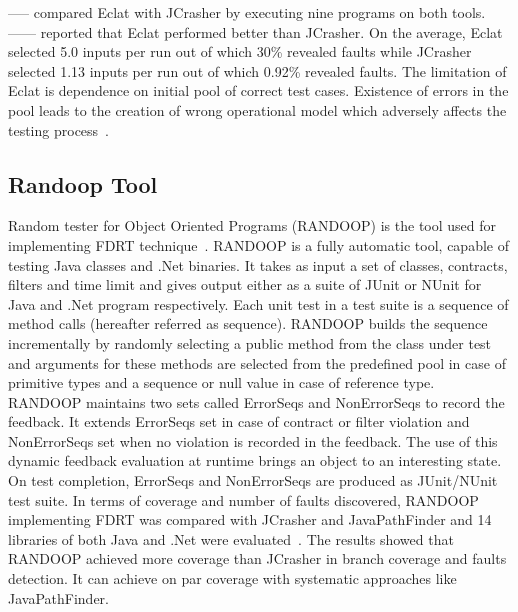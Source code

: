 ----- compared Eclat with JCrasher by executing nine programs on  both tools. ------ reported that Eclat performed better than JCrasher. On the average, Eclat selected 5.0 inputs per run out of which 30\% revealed faults while JCrasher selected 1.13 inputs per run out of which 0.92\% revealed faults. The limitation of Eclat is dependence on initial pool of correct test cases. Existence of errors in the pool leads to the creation of wrong operational model which adversely affects the testing process~\cite{Pacheco2007b}.   



\subsection{Randoop Tool}
Random tester for Object Oriented Programs (RANDOOP) is the tool used for implementing FDRT technique~\cite{Pacheco2007b}. RANDOOP is a fully automatic tool, capable of testing Java classes and .Net binaries. It takes as input a set of classes, contracts, filters and time limit and gives output either as a suite of JUnit or NUnit for Java and .Net program respectively. Each unit test in a test suite is a sequence of method calls (hereafter referred as sequence). RANDOOP builds the sequence incrementally by randomly selecting a public method from the class under test and arguments for these methods are selected from the predefined pool in case of primitive types and a sequence or null value in case of reference type. RANDOOP maintains two sets called ErrorSeqs and NonErrorSeqs to record the feedback. It extends ErrorSeqs set in case of contract or filter violation and NonErrorSeqs set when no violation is recorded in the feedback. The use of this dynamic feedback evaluation at runtime brings an object to an interesting state. On test completion, ErrorSeqs and NonErrorSeqs are produced as JUnit/NUnit test suite. In terms of coverage and number of faults discovered, RANDOOP implementing FDRT was compared with JCrasher and JavaPathFinder and 14 libraries of both Java and .Net were evaluated~\cite{visser2004test}. The results showed that RANDOOP achieved more coverage than JCrasher in branch coverage and faults detection. It can achieve on par coverage with systematic approaches like JavaPathFinder. 

